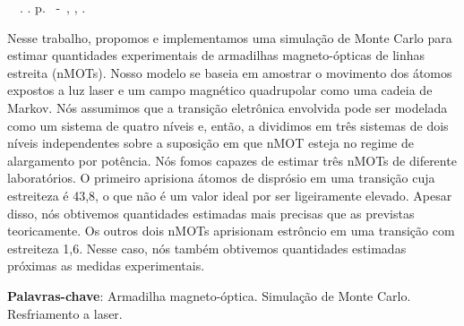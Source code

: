 \setlength{\absparsep}{18pt} %
\begin{resumo}
	\begin{flushleft} 
			\setlength{\absparsep}{0pt} %
			\SingleSpacing 
			\imprimirautorabr~~\textbf{\imprimirtituloresumo}.	\imprimirdata. \pageref{LastPage}p. 
			\imprimirtipotrabalho~-~\imprimirinstituicao, \imprimirlocal, \imprimirdata. 
 	\end{flushleft}
\OnehalfSpacing 			
Nesse trabalho, propomos e implementamos uma simulação de Monte Carlo para estimar quantidades experimentais de armadilhas magneto-ópticas de linhas estreita (nMOTs). Nosso modelo se baseia em amostrar o movimento dos átomos expostos a luz laser e um campo magnético quadrupolar como uma cadeia de Markov. Nós assumimos que a transição eletrônica envolvida pode ser modelada como um sistema de quatro níveis e, então, a dividimos em três sistemas de dois níveis independentes sobre a suposição em que nMOT esteja no regime de alargamento por potência. Nós fomos capazes de estimar três nMOTs de diferente laboratórios. O primeiro aprisiona átomos de disprósio em uma transição cuja estreiteza é 43,8, o que não é um valor ideal por ser ligeiramente elevado. Apesar disso, nós obtivemos quantidades estimadas mais precisas que as previstas teoricamente. Os outros dois nMOTs aprisionam estrôncio em uma transição com estreiteza 1,6. Nesse caso, nós também obtivemos quantidades estimadas próximas as medidas experimentais.
 

 \textbf{Palavras-chave}: Armadilha magneto-óptica. Simulação de Monte Carlo. Resfriamento a laser.
\end{resumo}

